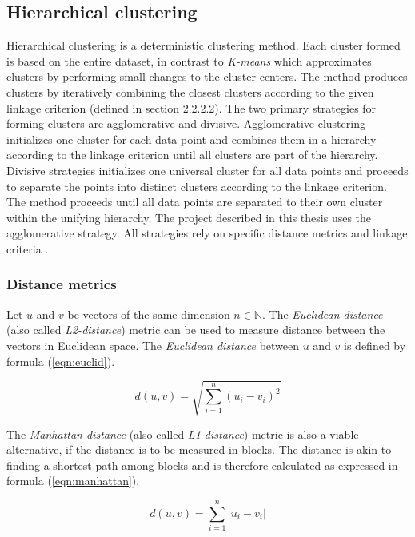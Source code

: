 \subsection{Hierarchical clustering}

Hierarchical clustering is a deterministic clustering method. Each cluster formed is based on the entire dataset, in contrast to \textit{K-means} which approximates clusters by performing small changes to the cluster centers. The method produces clusters by iteratively combining the closest clusters according to the given linkage criterion (defined in section 2.2.2.2). The two primary strategies for forming clusters are agglomerative and divisive. Agglomerative clustering initializes one cluster for each data point and combines them in a hierarchy according to the linkage criterion until all clusters are part of the hierarchy. Divisive strategies initializes one universal cluster for all data points and proceeds to separate the points into distinct clusters according to the linkage criterion. The method proceeds until all data points are separated to their own cluster within the unifying hierarchy. The project described in this thesis uses the agglomerative strategy. All strategies rely on specific distance metrics and linkage criteria \cite{murtagh1983survey}.

\subsubsection{Distance metrics}
Let $u$ and $v$ be vectors of the same dimension $n \in \mathbb{N}$. The \textit{Euclidean distance} (also called \textit{L2-distance}) metric can be used to measure distance between the vectors in Euclidean space. The \textit{Euclidean distance} between $u$ and $v$ is defined by formula (\ref{eqn:euclid}).

\begin{equation}
\label{eqn:euclid}
d(u, v) = \sqrt{\sum_{i=1}^n (u_i - v_i)^2} 
\end{equation}

The \textit{Manhattan distance} (also called \textit{L1-distance}) metric is also a viable alternative, if the distance is to be measured in blocks. The distance is akin to finding a shortest path among blocks and is therefore calculated as expressed in formula (\ref{eqn:manhattan}).

\begin{equation}
\label{eqn:manhattan}
d(u, v) = \sum_{i=1}^n |u_i - v_i|
\end{equation}

